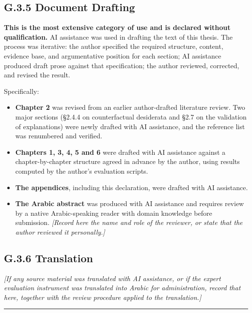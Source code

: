 \hypertarget{g.3.5-document-drafting}{%
\subsection{G.3.5 Document Drafting}\label{g.3.5-document-drafting}}

\textbf{This is the most extensive category of use and is declared without qualification.} AI assistance was used in drafting the text of this thesis. The process was iterative: the author specified the required structure, content, evidence base, and argumentative position for each section; AI assistance produced draft prose against that specification; the author reviewed, corrected, and revised the result.

Specifically:

\begin{itemize}
\tightlist
\item
  \textbf{Chapter 2} was revised from an earlier author-drafted literature review. Two major sections (§2.4.4 on counterfactual desiderata and §2.7 on the validation of explanations) were newly drafted with AI assistance, and the reference list was renumbered and verified.
\item
  \textbf{Chapters 1, 3, 4, 5 and 6} were drafted with AI assistance against a chapter-by-chapter structure agreed in advance by the author, using results computed by the author's evaluation scripts.
\item
  \textbf{The appendices}, including this declaration, were drafted with AI assistance.
\item
  \textbf{The Arabic abstract} was produced with AI assistance and requires review by a native Arabic-speaking reader with domain knowledge before submission. \emph{{[}Record here the name and role of the reviewer, or state that the author reviewed it personally.{]}}
\end{itemize}

\hypertarget{g.3.6-translation}{%
\subsection{G.3.6 Translation}\label{g.3.6-translation}}

\emph{{[}If any source material was translated with AI assistance, or if the expert evaluation instrument was translated into Arabic for administration, record that here, together with the review procedure applied to the translation.{]}}

\begin{center}\rule{0.5\linewidth}{0.5pt}\end{center}

